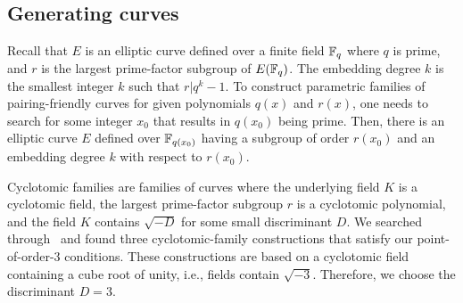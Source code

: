 
\subsection{Generating curves}
\label{subsec:gencurves}

Recall that $E$ is an elliptic curve defined over a finite field $\mathbb{F}_{q}$ where $q$ is prime,
and $r$ is the largest prime-factor subgroup of $E(\mathbb{F}_{q})$.
The embedding degree $k$ is the smallest integer $k$ such that $r | q^k -1$.
To construct parametric families of pairing-friendly curves for given polynomials $q(x)$ and $r(x)$,
one needs to search for some integer $x_0$ that results in $q(x_0)$ being prime.
Then, there is an elliptic curve $E$ defined over $\mathbb{F}_{q(x_0)}$ having a subgroup
of order $r(x_0)$ and an embedding degree $k$ with respect to $r(x_0)$.

Cyclotomic families are families of curves where the underlying field $K$ is a cyclotomic field,
the largest prime-factor subgroup $r$ is a cyclotomic polynomial,
and the field $K$ contains $\sqrt{-D}$ for some small discriminant $D$.
We searched through~\cite{2010/freeman} and found three cyclotomic-family constructions that satisfy our point-of-order-3 conditions.
These constructions are based on a cyclotomic field containing a cube root of unity,
i.e., fields contain $\sqrt{-3}$.
Therefore, we choose the discriminant $D = 3$.

